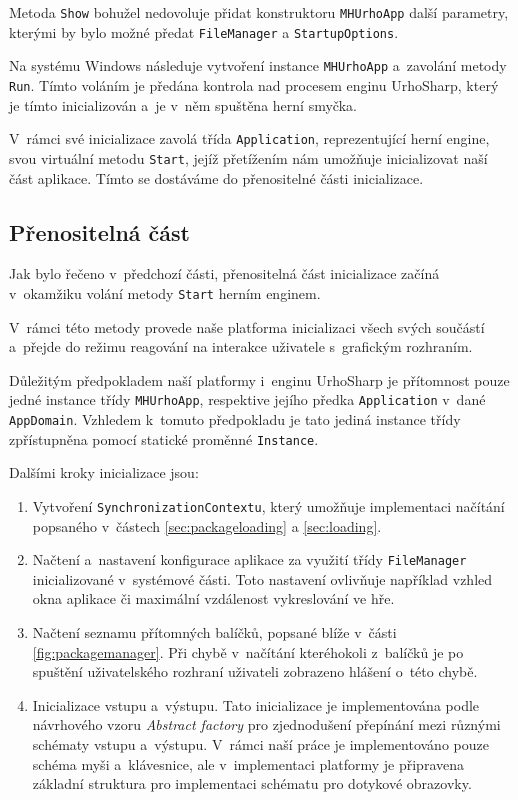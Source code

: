 Metoda \texttt{Show} bohužel nedovoluje přidat konstruktoru \texttt{MHUrhoApp} další parametry, kterými by bylo možné předat \texttt{FileManager} a \texttt{StartupOptions}.

Na systému Windows následuje vytvoření instance \texttt{MHUrhoApp} a~zavolání metody \texttt{Run}. Tímto voláním je předána kontrola nad procesem enginu UrhoSharp, který je tímto inicializován a~je v~něm spuštěna herní smyčka.

V~rámci své inicializace zavolá třída \texttt{Application}, reprezentující herní engine, svou virtuální metodu \texttt{Start}, jejíž přetížením nám umožňuje inicializovat naší část aplikace. Tímto se dostáváme do přenositelné části inicializace.

\subsection{Přenositelná část}

Jak bylo řečeno v~předchozí části, přenositelná část inicializace začíná v~okamžiku volání metody \texttt{Start} herním enginem.

V~rámci této metody provede naše platforma inicializaci všech svých součástí a~přejde do režimu reagování na interakce uživatele s~grafickým rozhraním.

Důležitým předpokladem naší platformy i~enginu UrhoSharp je přítomnost pouze jedné instance třídy \texttt{MHUrhoApp}, respektive jejího předka \texttt{Application} v~dané \texttt{AppDomain}. Vzhledem k~tomuto předpokladu je tato jediná instance třídy zpřístupněna pomocí statické proměnné \texttt{Instance}.

Dalšími kroky inicializace jsou:

\begin{enumerate}
	\item Vytvoření \texttt{SynchronizationContextu}, který umožňuje implementaci načítání popsaného v~částech \ref{sec:packageloading} a \ref{sec:loading}.
	\item Načtení a~nastavení konfigurace aplikace za využití třídy \texttt{FileManager} inicializované v~systémové části. Toto nastavení ovlivňuje například vzhled okna aplikace či maximální vzdálenost vykreslování ve hře.
	\item Načtení seznamu přítomných balíčků, popsané blíže v~části \ref{fig:packagemanager}. Při chybě v~načítání kteréhokoli z~balíčků je po spuštění uživatelského rozhraní uživateli zobrazeno hlášení o~této chybě.
	\item Inicializace vstupu a~výstupu. Tato inicializace je implementována podle návrhového vzoru \textit{Abstract factory} \citep[str.~87]{book:gangoffour} pro zjednodušení přepínání mezi různými schématy vstupu a~výstupu. V~rámci naší práce je implementováno pouze schéma myši a~klávesnice, ale v~implementaci platformy je připravena základní struktura pro implementaci schématu pro dotykové obrazovky. 
\end{enumerate}

